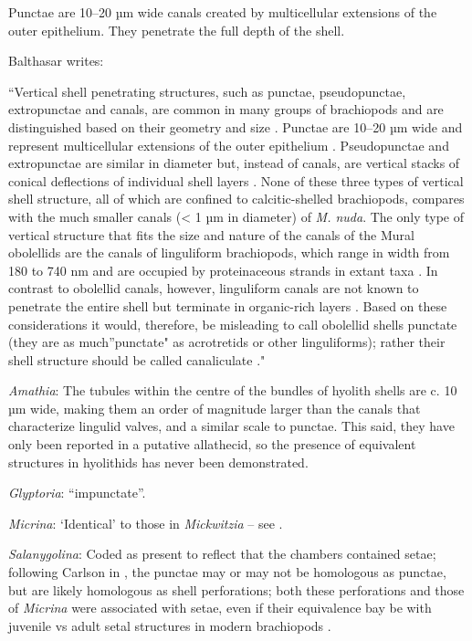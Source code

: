 \documentclass[openany]{book}
\theoremstyle{definition}
\theoremstyle{definition}
\theoremstyle{definition}
\theoremstyle{remark}
\begin{document}
Punctae are 10--20 µm wide canals created by multicellular extensions of
the outer epithelium. They penetrate the full depth of the shell.

Balthasar \citeyearpar{Balthasar2008iMummpikia} writes:

``Vertical shell penetrating structures, such as punctae, pseudopunctae,
extropunctae and canals, are common in many groups of brachiopods and
are distinguished based on their geometry and size
\citep{Williams1997Introduction}. Punctae are 10--20 µm wide and
represent multicellular extensions of the outer epithelium
\citep{Owen1969Thecaecum}. Pseudopunctae and extropunctae are similar in
diameter but, instead of canals, are vertical stacks of conical
deflections of individual shell layers \citep{Williams1993Roleof}. None
of these three types of vertical shell structure, all of which are
confined to calcitic-shelled brachiopods, compares with the much smaller
canals (\textless{} 1 µm in diameter) of \emph{M. nuda}. The only type
of vertical structure that fits the size and nature of the canals of the
Mural obolellids are the canals of linguliform brachiopods, which range
in width from 180 to 740 nm and are occupied by proteinaceous strands in
extant taxa
\citep{Williams1992Structureof, Williams1994Collagenouschitino, Williams1997Introduction}.
In contrast to obolellid canals, however, linguliform canals are not
known to penetrate the entire shell but terminate in organic-rich layers
\citep{Williams1997Introduction}. Based on these considerations it
would, therefore, be misleading to call obolellid shells punctate (they
are as much''punctate" as acrotretids or other linguliforms); rather
their shell structure should be called canaliculate
\citep{Williams1997Introduction}."

\hypertarget{Amathia-coding-128}{}
\emph{Amathia}: The tubules within the centre of the bundles of hyolith
shells \citep{Kouchinsky2000Skeletalmicrostructures} are c. 10 µm wide,
making them an order of magnitude larger than the canals that
characterize lingulid valves, and a similar scale to punctae. This said,
they have only been reported in a putative allathecid, so the presence
of equivalent structures in hyolithids has never been demonstrated.

\hypertarget{Glyptoria-coding-128}{}
\emph{Glyptoria}: ``impunctate''.

\hypertarget{Micrina-coding-128}{}
\emph{Micrina}: `Identical' to those in \emph{Mickwitzia} -- see
\citet{Williams2007Supplement}.

\hypertarget{Salanygolina-coding-128}{}
\emph{Salanygolina}: Coded as present to reflect that the chambers
contained setae; following Carlson in \citet{Williams2007Supplement},
the punctae may or may not be homologous as punctae, but are likely
homologous as shell perforations; both these perforations and those of
\emph{Micrina} were associated with setae, even if their equivalence bay
be with juvenile vs adult setal structures in modern brachiopods
\citep[p.~397]{Balthasar2004Shellstructure}.
\end{document}
